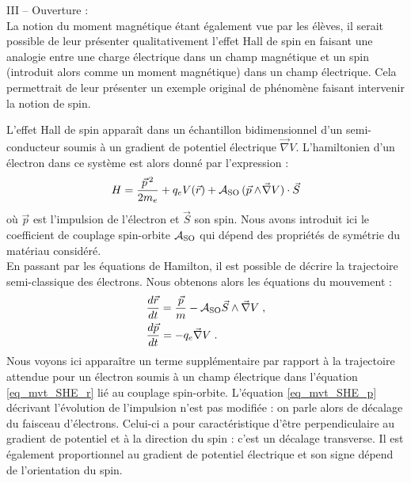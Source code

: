 \documentclass[a4paper,11pt]{article} %
\newenvironment{encart}[1]{%
	\begin{tcolorbox}
		[
		breakable, enhanced jigsaw, %
		arc = 1mm, %
		title = \textbf{#1}, %
		coltitle = white, %
		colbacktitle = blue, %
		colback = white, %
		colframe = blue %
		]
}{		
	\end{tcolorbox}
	\vspace*{0.35cm}
}
\begin{document}
\begin{encart}{Activité pédagogique 1 : \'Etude de l'effet Hall classique}
		\vspace{0.5cm}
		III -- Ouverture :\\
		La notion du moment magnétique étant également vue par les élèves, il serait possible de leur présenter qualitativement l'effet Hall de spin en faisant une analogie entre une charge électrique dans un champ magnétique et un spin (introduit alors comme un moment magnétique) dans un champ électrique. Cela permettrait de leur présenter un exemple original de phénomène faisant intervenir la notion de spin.
	\end{encart}
	
	L'effet Hall de spin apparaît dans un échantillon bidimensionnel d'un semi-conducteur soumis à un gradient de potentiel électrique $\vec{\nabla} V$. L'hamiltonien d'un électron dans ce système est alors donné par l'expression :
	\begin{equation}
		\label{exp_hamiltonien_SHE}
		H = \frac{\vec{p}^{\, 2}}{2m_e} + q_e V(\vec{r}) + \mathcal{A}_\textup{SO} \, (\vec{p} \wedge \! \vec{\nabla} V) \cdot \vec{S}
	\end{equation}
	où $ \vec{p} $ est l'impulsion de l'électron et $ \vec{S} $ son spin. Nous avons introduit ici le coefficient de couplage spin-orbite $ \mathcal{A}_\textup{SO} $ qui dépend des propriétés de symétrie du matériau considéré.\\
	
	En passant par les équations de Hamilton, il est possible de décrire la trajectoire semi-classique des électrons. Nous obtenons alors les équations du mouvement :
	\begin{align}
		& \frac{d\vec{r}}{dt} = \frac{\vec{p}}{m} - \mathcal{A}_\textup{SO} \vec{S} \wedge \vec{\nabla} V \label{eq_mvt_SHE_r} \; , \\
		& \frac{d \vec{p}}{dt} = - q_e \vec{\nabla} V \label{eq_mvt_SHE_p} \; .
	\end{align}
	Nous voyons ici apparaître un terme supplémentaire par rapport à la trajectoire attendue pour un électron soumis à un champ électrique dans l'équation \eqref{eq_mvt_SHE_r} lié au couplage spin-orbite. L'équation \eqref{eq_mvt_SHE_p} décrivant l'évolution de l'impulsion n'est pas modifiée : on parle alors de décalage du faisceau d'électrons. Celui-ci a pour caractéristique d'être perpendiculaire au gradient de potentiel et à la direction du spin : c'est un décalage transverse. Il est également proportionnel au gradient de potentiel électrique et son signe dépend de l'orientation du spin.
	
	
\end{document}
